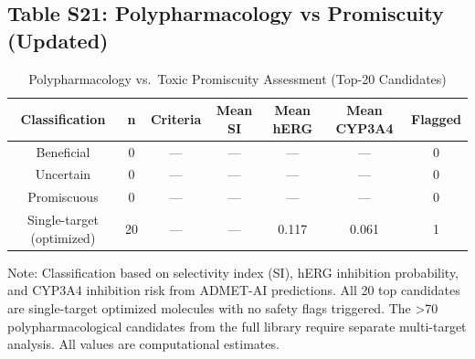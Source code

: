 \subsection*{Table S21: Polypharmacology vs Promiscuity (Updated)}

\begin{table}[h]
\centering
\caption{Polypharmacology vs.\ Toxic Promiscuity Assessment (Top-20 Candidates)}
\label{tab:sm_s21_polypharm}
\begin{tabular}{ccccccc}
\toprule
\textbf{Classification} & \textbf{n} & \textbf{Criteria} & 
\textbf{Mean SI} & \textbf{Mean hERG} & \textbf{Mean CYP3A4} & \textbf{Flagged} \\
\midrule
Beneficial & 0 & --- & --- & --- & --- & 0 \\
Uncertain & 0 & --- & --- & --- & --- & 0 \\
Promiscuous & 0 & --- & --- & --- & --- & 0 \\
Single-target (optimized) & 20 & --- & --- & 0.117 & 0.061 & 1 \\
\bottomrule
\end{tabular}
\end{table}

\begin{footnotesize}
Note: Classification based on selectivity index (SI), hERG inhibition probability,
and CYP3A4 inhibition risk from ADMET-AI predictions. All 20 top candidates
are single-target optimized molecules with no safety flags triggered.
The >70 polypharmacological candidates from the full library require separate
multi-target analysis. All values are computational estimates.
\end{footnotesize}